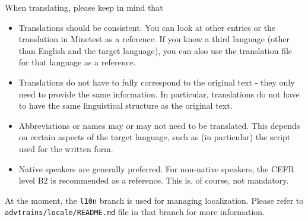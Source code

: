 When translating, please keep in mind that
\begin{itemize}
\item Translations should be consistent. You can look at other entries or the translation in Minetest as a reference. If you know a third language (other than English and the target language), you can also use the translation file for that language as a reference.
\item Translations do not have to fully correspond to the original text - they only need to provide the same information. In particular, translations do not have to have the same linguistical structure as the original text.
\item Abbreviations or names may or may not need to be translated. This depends on certain aspects of the target language, such as (in particular) the script used for the written form.
\item Native speakers are generally preferred. For non-native speakers, the CEFR level B2 is recommended as a reference. This is, of course, not mandatory.
\end{itemize}

At the moment, the \texttt{l10n} branch is used for managing localization. Please refer to \texttt{advtrains/locale/README.md} file in that branch for more information.

